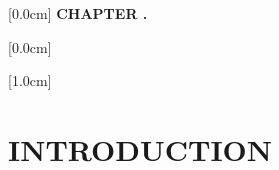 \documentclass[a4paper,13pt,3p,twoside]{report}
\title{\bf \TITLE}
\author{\AUTHOR}
\renewcommand{\figurename}{Figure}
\renewcommand{\tablename}{Table}
\renewcommand{\chaptername}{CHAPTER}
\theoremstyle{definition}
\begin{document}



\renewcommand{\figurename}{Figure}
\renewcommand{\tablename}{Table}
\renewcommand{\chaptername}{CHAPTER}

\newpage


\newpage


\newpage
{}
\renewcommand*\contentsname{TABLE OF CONTENTS}

    [0.0cm]
    {\bfseries\vspace{0.3cm}}
    {{\bfseries{\scshape} CHAPTER \thecontentslabel.\ }}
    {}
    {\contentspage}

    [0.0cm]
    {\vspace{0.3cm}}
    {\thecontentslabel \ }
    {}
    {\contentspage}

    [1.0cm]
    {\vspace{0.3cm}}
    {\thecontentslabel \ }
    {}
    {\contentspage}

\tableofcontents
\thispagestyle{empty}
\cleardoublepage

\renewcommand{\listfigurename}{LIST OF FIGURES}
{\let\oldnumberline\numberline
\renewcommand{\numberline}{Figure~\oldnumberline}
\listoffigures}
\newpage

\renewcommand{\listtablename}{LIST OF TABLES}
{\let\oldnumberline\numberline
\renewcommand{\numberline}{Table~\oldnumberline}
\listoftables}

\glsaddall
\renewcommand*{\acronymname}{LIST OF ABBREVIATIONS}
\renewcommand*{\entryname}{Abbreviation}
\renewcommand*{\descriptionname}{Full Expression}
\printnoidxglossaries

\newpage
{}

\pagestyle{fancy}
\fancyhf{}
\fancyhead[RE, LO]{\leftmark}
\fancyfoot[RE, LO]{\thepage}

\chapter{INTRODUCTION}
\label{chapter:Introduction}


\newpage
\end{document}
